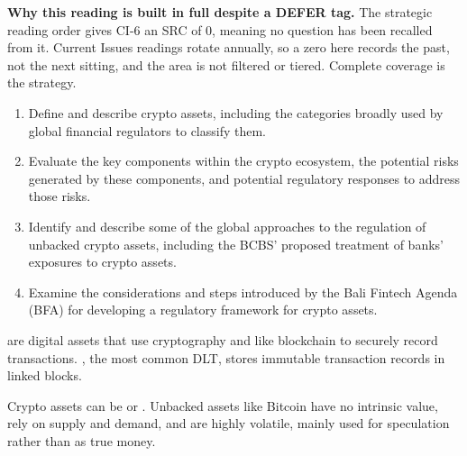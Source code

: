
\begin{cisrcbox}
{\sffamily\bfseries\color{FRMNavy}Why this reading is built in full despite a DEFER tag.}
The strategic reading order gives CI-6 an SRC of 0, meaning no question has been recalled
from it. Current Issues readings rotate annually, so a zero here records the past, not the
next sitting, and the area is not filtered or tiered. Complete coverage is the strategy.
\end{cisrcbox}

\begin{cikeybox}[title={The four objectives, in the spine's own words}]
\begin{enumerate}[label=\textbf{\alph*.}]
\item Define and describe crypto assets, including the categories broadly used by global
financial regulators to classify them.
\item Evaluate the key components within the crypto ecosystem, the potential risks generated
by these components, and potential regulatory responses to address those risks.
\item Identify and describe some of the global approaches to the regulation of unbacked crypto
assets, including the BCBS' proposed treatment of banks' exposures to crypto assets.
\item Examine the considerations and steps introduced by the Bali Fintech Agenda (BFA) for
developing a regulatory framework for crypto assets.
\end{enumerate}
\end{cikeybox}


\begin{cidefbox}[title={Crypto assets}]
 are digital assets that use cryptography and  like blockchain to securely record transactions. , the
most common DLT, stores immutable transaction records in linked blocks.\par\vspace{4pt}
Crypto assets can be  or . Unbacked assets like Bitcoin have no
intrinsic value, rely on supply and demand, and are highly volatile, mainly used for
speculation rather than as true money.
\end{cidefbox}

